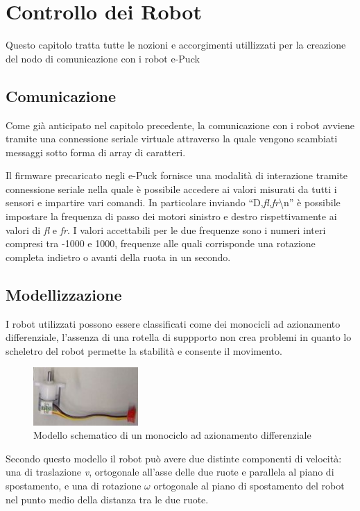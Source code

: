 \chapter{Controllo dei Robot}

Questo capitolo tratta tutte le nozioni e accorgimenti utillizzati per la creazione del nodo di comunicazione con i robot e-Puck
\section{Comunicazione}
	Come gi\`a anticipato nel capitolo precedente, la comunicazione con i robot avviene tramite una connessione seriale virtuale attraverso la quale vengono scambiati messaggi sotto forma di array di caratteri.
	
	Il firmware precaricato negli e-Puck fornisce una modalit\`a di interazione tramite connessione seriale nella quale \`e possibile accedere ai valori misurati da tutti i sensori e impartire vari comandi.
	In particolare inviando ``D,\emph{fl},\emph{fr}\textbackslash n'' \`e possibile impostare la frequenza di passo dei motori sinistro e destro rispettivamente ai valori di \emph{fl} e \emph{fr}.
	I valori accettabili per le due frequenze sono i numeri interi compresi tra -1000 e 1000, frequenze alle quali corrisponde una rotazione completa indietro o avanti della ruota in un secondo.
	
	  
\section{Modellizzazione}
	I robot utilizzati possono essere classificati come dei monocicli ad azionamento differenziale, l'assenza di una rotella di suppporto non crea problemi in quanto lo scheletro del robot permette la stabilit\`a e consente il movimento.
	\begin{figure}[H]
	\centering
	\includegraphics[width=4cm]{images/motor+cable}
	\caption{Modello schematico di un monociclo ad azionamento differenziale \label{unicycle}}
	\end{figure}
	
	Secondo questo modello il robot pu\`o avere due distinte componenti di velocit\`a: una di traslazione \emph{v}, ortogonale all'asse delle due ruote e parallela al piano di spostamento, e una di rotazione $\omega$ ortogonale al piano di spostamento del robot nel punto medio della distanza tra le due ruote.
	
